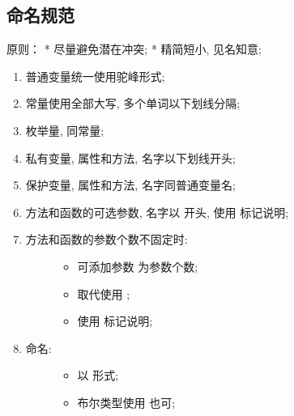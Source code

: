 \documentclass[letterpaper,10pt,english]{sphinxmanual}
\begin{document}
\subsection{命名规范}
\label{styleguide/js-style-rules:id9}
原则：
* 尽量避免潜在冲突;
* 精简短小, 见名知意;
\begin{enumerate}
\item {}
普通变量统一使用驼峰形式;

\item {}
常量使用全部大写, 多个单词以下划线分隔;

\item {}
枚举量, 同常量;

\item {}
私有变量, 属性和方法, 名字以下划线开头;

\item {}
保护变量, 属性和方法, 名字同普通变量名;

\item {}
方法和函数的可选参数, 名字以  开头, 使用  标记说明;

\item {} \begin{description}
\item[{方法和函数的参数个数不固定时:}] \leavevmode\begin{itemize}
\item {}
可添加参数  为参数个数;

\item {}
取代使用 ;

\item {}
使用  标记说明;

\end{itemize}

\end{description}

\item {} \begin{description}
\item[{ 命名:}] \leavevmode\begin{itemize}
\item {}
以  形式;

\item {}
布尔类型使用  也可;

\end{itemize}

\end{description}


\end{enumerate}
\end{document}
